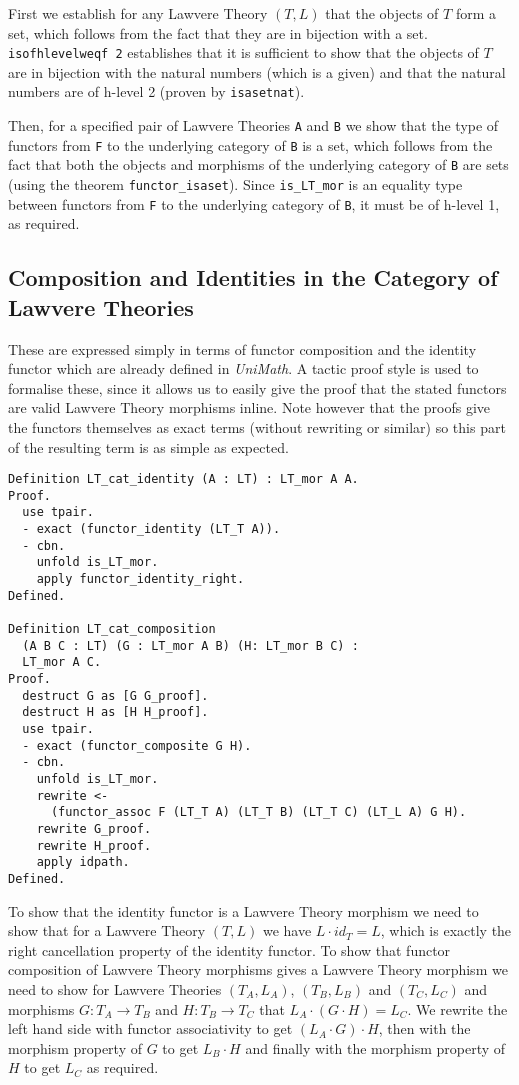 First we establish for any Lawvere Theory $(T, L)$ that the objects of $T$ form
a set, which follows from the fact that they are in bijection with a set.
\lstinline|isofhlevelweqf 2| establishes that it is sufficient to show that the
objects of $T$ are in bijection with the natural numbers (which is a given) and
that the natural numbers are of h-level 2 (proven by \lstinline|isasetnat|).

Then, for a specified pair of Lawvere Theories \lstinline|A| and \lstinline|B|
we show that the type of functors from \lstinline|F| to the underlying category
of \lstinline|B| is a set, which follows from the fact that both the objects and
morphisms of the underlying category of \lstinline|B| are sets (using the
theorem \lstinline|functor_isaset|). Since \lstinline|is_LT_mor| is an equality
type between functors from \lstinline|F| to the underlying category of
\lstinline|B|, it must be of h-level 1, as required.

\subsection{Composition and Identities in the Category of Lawvere Theories}
These are expressed simply in terms of functor composition and the identity
functor which are already defined in \textit{UniMath}. A tactic proof style is
used to formalise these, since it allows us to easily give the proof that the
stated functors are valid Lawvere Theory morphisms inline. Note however that
the proofs give the functors themselves as exact terms (without rewriting or
similar) so this part of the resulting term is as simple as expected.
\begin{lstlisting}
Definition LT_cat_identity (A : LT) : LT_mor A A.
Proof.
  use tpair.
  - exact (functor_identity (LT_T A)).
  - cbn.
    unfold is_LT_mor.
    apply functor_identity_right.
Defined.

Definition LT_cat_composition 
  (A B C : LT) (G : LT_mor A B) (H: LT_mor B C) :
  LT_mor A C.
Proof.
  destruct G as [G G_proof].
  destruct H as [H H_proof].
  use tpair.
  - exact (functor_composite G H).
  - cbn.
    unfold is_LT_mor.
    rewrite <- 
      (functor_assoc F (LT_T A) (LT_T B) (LT_T C) (LT_L A) G H).
    rewrite G_proof.
    rewrite H_proof.
    apply idpath.
Defined.
\end{lstlisting}

To show that the identity functor is a Lawvere Theory morphism we need to show
that for a Lawvere Theory $(T, L)$ we have $L\cdot id_T = L$, which is exactly
the right cancellation property of the identity functor. To show that functor
composition of Lawvere Theory morphisms gives a Lawvere Theory morphism we need
to show for Lawvere Theories $(T_A, L_A)$, $(T_B, L_B)$ and $(T_C, L_C)$
and morphisms $G: T_A\to T_B$ and $H: T_B\to T_C$ that $L_A\cdot (G\cdot H) =
L_C$. We rewrite the left hand side with functor associativity to get $(L_A\cdot
G)\cdot H$, then with the morphism property of $G$ to get $L_B\cdot H$ and
finally with the morphism property of $H$ to get $L_C$ as required.


